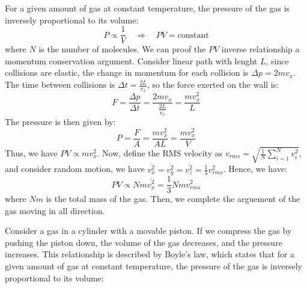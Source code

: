 \documentclass[11pt]{report}
\begin{document}
\begin{definition}
    For a given amount of gas at constant temperature, the pressure of the gas is inversely proportional to its volume:
    \begin{equation}
        P \propto \frac{1}{V} \quad \Rightarrow \quad PV = \text{constant}
    \end{equation}
    where $N$ is the number of molecules. We can proof the $PV$ inverse relationship a momentum conservation argument. Consider linear path with lenght $L$, since collisions are elastic, the change in momentum for each collision is $\Delta p = 2mv_x$. The time between collisions is $\Delta t = \frac{2L}{v_x}$, so the force exerted on the wall is:
    $$
        F = \frac{\Delta p}{\Delta t} = \frac{2mv_x}{\frac{2L}{v_x}} = \frac{mv_x^2}{L}
    $$
    The pressure is then given by:
    $$
        P = \frac{F}{A} = \frac{mv_x^2}{AL} = \frac{mv_x^2}{V}
    $$
    Thus, we have $PV \propto mv_x^2$. Now, define the RMS velocity as $v_{rms} = \sqrt{\frac{1}{N} \sum_{i=1}^N v_i^2}$, and consider random motion, we have $\overline{v_x^2} = \overline{v_y^2} = \overline{v_z^2} = \frac{1}{3} v_{rms}^2$. Hence, we have:
    $$
        PV \propto Nm \overline{v_x^2} = \frac{1}{3} Nm v_{rms}^2
    $$
    where $Nm$ is the total mass of the gas. Then, we complete the arguement of the gas moving in all direction.
\end{definition}

\begin{example}
    Consider a gas in a cylinder with a movable piston. If we compress the gas by pushing the piston down, the volume of the gas decreases, and the pressure increases. This relationship is described by Boyle's law, which states that for a given amount of gas at constant temperature, the pressure of the gas is inversely proportional to its volume:
\end{example}
\end{document}
